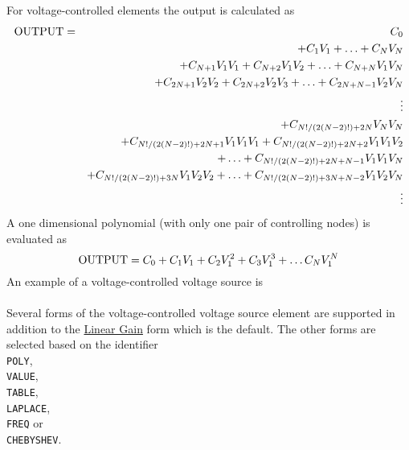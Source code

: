 For voltage-controlled elements the output is calculated as
\begin{eqnarray}
{\rm OUTPUT} & = & C_0 \nonumber\\
         &   & + C_1V_1 + \ldots + C_NV_N\nonumber\\
         &   & + C_{N+1}V_1V_1 + C_{N+2}V_1V_2 + \ldots + C_{N+N}V_1V_N
               \nonumber\\
         &   & + C_{2N+1}V_2V_2 + C_{2N+2}V_2V_3 +\ldots + C_{2N+N-1}V_2V_N
               \nonumber\\
         &   & \vdots \nonumber\\
         &   & + C_{N!/(2(N-2)!)+2N}V_NV_N
               \nonumber\\
         &   & + C_{N!/(2(N-2)!)+2N+1}V_1V_1V_1 +
               C_{N!/(2(N-2)!)+2N+2}V_1V_1V_2\nonumber\\
         &   &\ \ \ \ \ \ \ \ \ + \ldots +
               C_{N!/(2(N-2)!)+2N+N-1}V_1V_1V_N
                     \nonumber\\
         &   & + C_{N!/(2(N-2)!)+3N}V_1V_2V_2 + \ldots +
               C_{N!/(2(N-2)!)+3N+N-2}V_1V_2V_N
                     \nonumber\\
         &   & \vdots\nonumber
\end{eqnarray}
A one dimensional polynomial (with only one pair of controlling
nodes) is evaluated as
\[
{\rm OUTPUT} = C_0 + C_1V_1 + C_2V_1^2 + C_3V_1^3 + \ldots
C_NV_1^N
\]
An example of a voltage-controlled voltage source is\\[0.1in]
\hspace*{\fill} \\[0.1in]

Several forms of the voltage-controlled voltage source element are
supported in addition to the \underline{Linear Gain} form which is
the default. The other forms are selected based on the identifier\\
      {\tt POLY},\\
      {\tt VALUE},\\
      {\tt TABLE},\\
      {\tt LAPLACE},\\
      {\tt FREQ} or\\
      {\tt CHEBYSHEV}.

